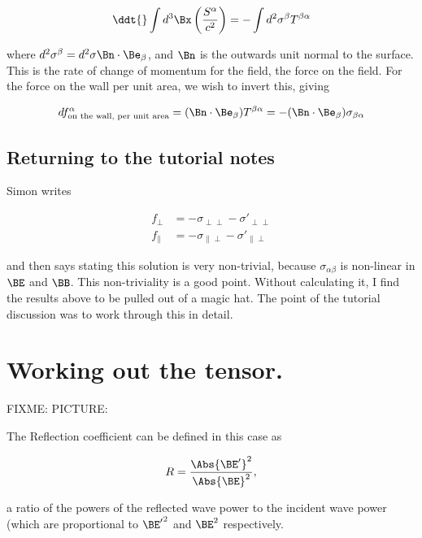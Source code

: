 \begin{equation}\label{eqn:relativisticElectrodynamicsT9:11}
\ddt{} \int d^3 \Bx \left( \frac{S^\alpha}{c^2} \right) = - \int d^2 \sigma^\beta T^{\beta \alpha}
\end{equation}

where $d^2 \sigma^\beta = d^2 \sigma \Bn \cdot \Be_\beta$, and $\Bn$ is the outwards unit normal to the surface.  This is the rate of change of momentum for the field, the force on the field.  For the force on the wall per unit area, we wish to invert this, giving

\begin{equation}\label{eqn:relativisticElectrodynamicsT9:n}
df^\alpha_{\text{on the wall, per unit area}}
= (\Bn \cdot \Be_\beta) T^{\beta \alpha}
= -(\Bn \cdot \Be_\beta) \sigma_{\beta \alpha}
\end{equation}

\subsection{Returning to the tutorial notes}

Simon writes

\begin{align}\label{eqn:relativisticElectrodynamicsT9:30}
f_\perp &= - \sigma_{\perp \perp} - {\sigma'}_{\perp \perp} \\
f_\parallel &= - \sigma_{\parallel \perp} - {\sigma'}_{\parallel \perp} 
\end{align}

and then says stating this solution is very non-trivial, because $\sigma_{\alpha \beta}$ is non-linear in $\BE$ and $\BB$.  This non-triviality is a good point.  Without calculating it, I find the results above to be pulled out of a magic hat.  The point of the tutorial discussion was to work through this in detail.

\section{Working out the tensor.}

FIXME: PICTURE: 

The Reflection coefficient can be defined in this case as

\begin{equation}\label{eqn:relativisticElectrodynamicsT9:50}
R = \frac{ \Abs{\BE'}^2 }{ \Abs{\BE}^2 },
\end{equation}

a ratio of the powers of the reflected wave power to the incident wave power (which are proportional to ${\BE'}^2$ and ${\BE}^2$ respectively.

